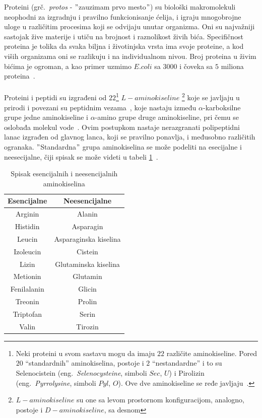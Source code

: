 Proteini (grč.~{\em protos} - $"$zauzimam prvo mesto$"$) su biološki makromolekuli neophodni za izgradnju i pravilno funkcionisanje ćelija, i igraju mnogobrojne uloge u različitim procesima koji se odvijaju unutar organizma. Oni su najvažniji sastojak žive materije i utiču na brojnost i raznolikost živih bića. Specifičnost proteina je tolika da svaka biljna i životinjska vrsta ima svoje proteine, a kod viših organizama oni se razlikuju i na individualnom nivou. Broj proteina u živim bićima je ogroman, a kao primer uzmimo $E. coli$ sa $3000$ i čoveka sa $5$ miliona proteina~\cite{spasic}. \\\\
Proteini i peptidi su izgrađeni od $22$\footnote{Neki proteini u svom sastavu mogu da imaju $22$ različite aminokiseline. Pored $20$ “standardnih” aminokiselina,
postoje i $2$ “nestandardne” i to su Selenocistein (eng.~{\em Selenocysteine}, simboli $Sec$, $U$) i Pirolizin (eng.~{\em Pyrrolysine},
simboli $Pyl$, $O$). Ove dve aminokiseline se ređe javljaju~\cite{MarijaJ}.} $L-aminokiseline$ \footnote{$L-aminokiseline$ su one sa levom prostornom konfiguracijom, analogno, postoje i $D-aminokiseline$, sa desnom} koje se javljaju u prirodi i povezani su peptidnim vezama~\cite{biopathways}, koje nastaju između $\alpha$-karboksilne grupe jedne aminokiseline i $\alpha$-amino grupe druge aminokiseline, pri čemu se oslobađa molekul vode~\cite{MarijaJ}. Ovim postupkom nastaje nerazgranati polipeptidni lanac izgrađen od glavnog lanca, koji se pravilno ponavlja, i međusobno različitih ogranaka. $"$Standardna$"$ grupa aminokiselina se može podeliti na esecijalne i
neesecijalne, čiji spisak se može videti u tabeli \ref{table:1}~\cite{MarijaJ}. 
\begin{table}[h!]
\centering
	\begin{tabular}{||c c||} 
	\hline 
	Esencijalne & Neesencijalne \\ [0.5ex] 
	\hline\hline
	Arginin & Alanin \\ 
	\hline
	Histidin & Asparagin \\
	\hline
	Leucin & Asparaginska kiselina\\
	\hline
	Izoleucin & Cistein \\
	\hline
	Lizin & Glutaminska kiselina \\ [1ex] 
	\hline
	Metionin & Glutamin \\ [1ex] 
	\hline
	Fenilalanin & Glicin \\ [1ex] 
	\hline
	Treonin & Prolin \\ [1ex] 
	\hline
	Triptofan & Serin \\ [1ex] 
	\hline
	Valin & Tirozin \\ [1ex] 
	\hline
	\end{tabular}
\caption{Spisak esencijalnih i neesencijalnih aminokiselina}
\label{table:1}
\end{table}
